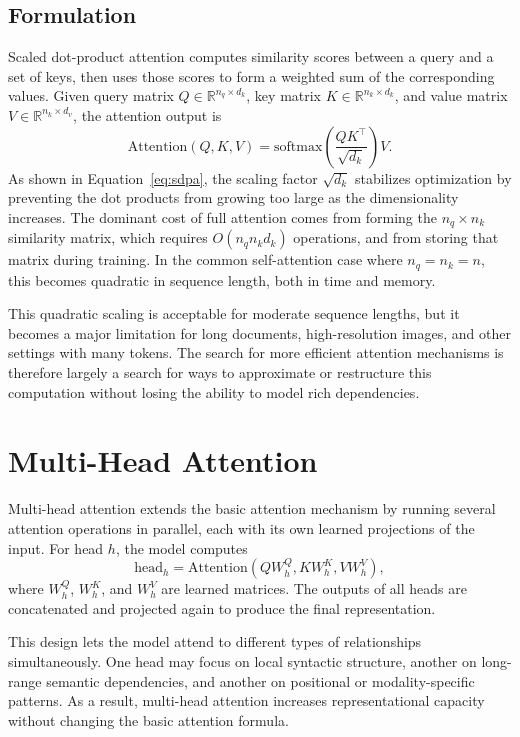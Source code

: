 \documentclass[a4paper,11pt]{article}
\begin{document}
\subsection{Formulation}

Scaled dot-product attention computes similarity scores between a query and a set of keys, then uses those scores to form a weighted sum of the corresponding values. Given query matrix $Q \in \mathbb{R}^{n_q \times d_k}$, key matrix $K \in \mathbb{R}^{n_k \times d_k}$, and value matrix $V \in \mathbb{R}^{n_k \times d_v}$, the attention output is
\begin{equation}
  \label{eq:sdpa}
  \mathrm{Attention}(Q,K,V) = \mathrm{softmax}\!\left(\frac{QK^\top}{\sqrt{d_k}}\right)V.
\end{equation}
As shown in Equation~\eqref{eq:sdpa}, the scaling factor $\sqrt{d_k}$ stabilizes optimization by preventing the dot products from growing too large as the dimensionality increases.
The dominant cost of full attention comes from forming the $n_q \times n_k$ similarity matrix, which requires $O(n_q n_k d_k)$ operations, and from storing that matrix during training. In the common self-attention case where $n_q = n_k = n$, this becomes quadratic in sequence length, both in time and memory.

This quadratic scaling is acceptable for moderate sequence lengths, but it becomes a major limitation for long documents, high-resolution images, and other settings with many tokens. The search for more efficient attention mechanisms is therefore largely a search for ways to approximate or restructure this computation without losing the ability to model rich dependencies.
\section{Multi-Head Attention}\label{sec:multihead}

Multi-head attention extends the basic attention mechanism by running several attention operations in parallel, each with its own learned projections of the input. For head $h$, the model computes
\[
  \mathrm{head}_h = \mathrm{Attention}(QW_h^Q, KW_h^K, VW_h^V),
\]
where $W_h^Q$, $W_h^K$, and $W_h^V$ are learned matrices. The outputs of all heads are concatenated and projected again to produce the final representation.

This design lets the model attend to different types of relationships simultaneously. One head may focus on local syntactic structure, another on long-range semantic dependencies, and another on positional or modality-specific patterns. As a result, multi-head attention increases representational capacity without changing the basic attention formula.
\end{document}
